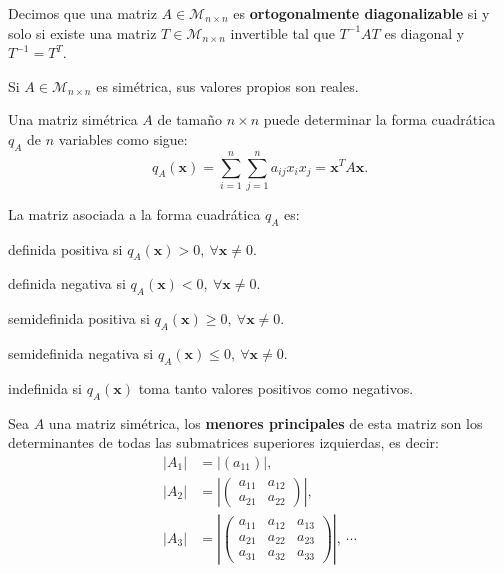 \documentclass[8pt,a4paper]{extarticle}
\begin{document}
\begin{multicols}{3}
\begin{boxdef}
	Decimos que una matriz $A \in \mathcal{M}_{n \times n}$ es \textbf{ortogonalmente diagonalizable} si y solo si existe una matriz $T  \in \mathcal{M}_{n \times n}$ invertible tal que $T^{-1}AT$ es diagonal y $T^{-1} = T^T$.
\end{boxdef}

\begin{boxtheo}[]
	Si $A \in \mathcal{M}_{n \times n}$ es simétrica, sus valores propios son reales.
\end{boxtheo}

\begin{boxtheo}[]
	Una matriz simétrica $A$ de tamaño $n \times n$ puede determinar la forma cuadrática $q_A$ de $n$ variables como sigue:
	\[
		q_A (\mathbf{x}) = \sum_{i = 1}^n \sum_{j = 1}^n a_{ij}x_ix_j = \mathbf{x}^T A \mathbf{x}
	.\] 
\end{boxtheo}

\begin{boxcor}
	La matriz asociada a la forma cuadrática $q_A$ es:
	\begin{eqlist}
	\item definida positiva si $q_A(\mathbf{x}) > 0,\ \forall \mathbf{x} \neq 0$.
	\item definida negativa si $q_A(\mathbf{x}) < 0,\ \forall \mathbf{x} \neq 0$.
	\item semidefinida positiva si $q_A(\mathbf{x}) \ge 0,\ \forall \mathbf{x} \neq 0$.
	\item semidefinida negativa si $q_A(\mathbf{x}) \le 0,\ \forall \mathbf{x} \neq 0$.
	\item indefinida si $q_A(\mathbf{x})$ toma tanto valores positivos como negativos.
	\end{eqlist}
\end{boxcor}

\begin{boxdef}
	Sea $A$ una matriz simétrica, los \textbf{menores principales} de esta matriz son los determinantes de todas las submatrices superiores izquierdas, es decir:
\begin{align*}
	\left| A_1 \right|  &= \left| (a_{11}) \right|, \\
	\left| A_2 \right| &= \left| \begin{pmatrix} a_{11} & a_{12} \\ a_{21} & a_{22} \end{pmatrix}  \right|, \\
	\left| A_3 \right| &= \left| \begin{pmatrix} a_{11} & a_{12} & a_{13} \\ a_{21} & a_{22} & a_{23} \\ a_{31} & a_{32} & a_{33} \end{pmatrix}  \right|,\ \cdots
\end{align*} 
\end{boxdef}


\end{multicols}
\end{document}
